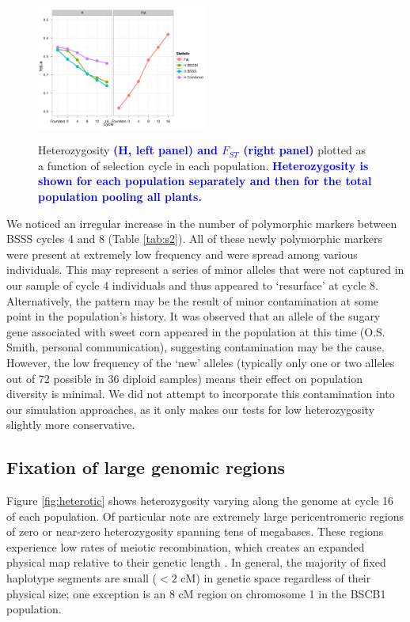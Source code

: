 \documentclass[twocolumn,twoside,letterpaper]{article}
\newcommand{\jpg}[1]{\todo[size=\scriptsize, color=gerkegreen]{#1}}
\newcommand{\rev}[1]{\textcolor{blue}{\bf #1}}
\begin{document}
\begin{figure}[tb]   
  \begin{center}
   \vspace{-0mm}
   \includegraphics[width=0.5\textwidth]{fig2}
   \renewcommand{\baselinestretch}{0.9}
   \vspace{-3mm}
   \caption{Heterozygosity \rev{(H, left panel) and $F_{ST}$ (right panel)} plotted as a function of selection cycle in each population. \rev{Heterozygosity is shown for each population separately and then for the total population pooling all plants.}
} 
\vspace{-6mm}
    \label{fig:decline}
  \end{center}
\end{figure}

We noticed an irregular increase in the number of polymorphic markers between BSSS cycles 4 and 8 (Table \ref{tab:s2}). \jpg{S3 now?}
All of these newly polymorphic markers were present at extremely low frequency and were spread among various individuals. 
This may represent a series of minor alleles that were not captured in our sample of cycle 4 individuals and thus appeared to ‘resurface’ at cycle 8. 
Alternatively, the pattern may be the result of minor contamination at some point in the population’s history. 
It was observed that an allele of the sugary gene associated with sweet corn appeared in the population at this time (O.S. Smith, personal communication), suggesting contamination may be the cause. 
However, the low frequency of the ‘new’ alleles (typically only one or two alleles out of 72 possible in 36 diploid samples) means their effect on population diversity is minimal.  
We did not attempt to incorporate this contamination into our simulation approaches, as it only makes our tests for low heterozygosity slightly more conservative.

\subsection*{Fixation of large genomic regions}
Figure \ref{fig:heterotic} shows heterozygosity varying along the genome at cycle 16 of each population. 
Of particular note are extremely large pericentromeric regions of zero or near-zero heterozygosity spanning tens of megabases. 
These regions experience low rates of meiotic recombination, which creates an expanded physical map relative to their genetic length \citep{ganal2011a-large}. 
In general, the majority of fixed haplotype segments are small ($<2$ cM) in genetic space regardless of their physical size; one exception is an 8 cM region on chromosome 1 in the BSCB1 population. 
\end{document}
